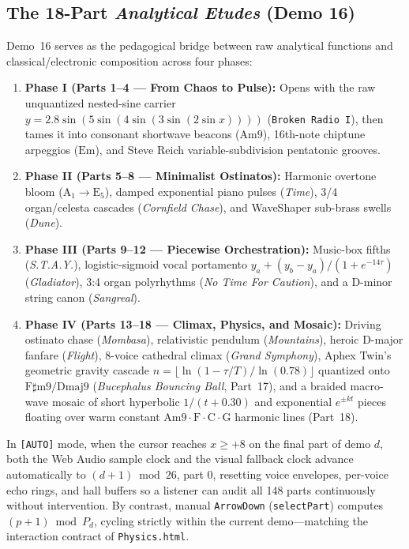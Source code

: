 \subsection*{The 18-Part \emph{Analytical Etudes} (Demo 16)}

Demo~16 serves as the pedagogical bridge between raw analytical functions and classical/electronic composition across four phases:
\begin{enumerate}[leftmargin=1.5em]
  \item \textbf{Phase I (Parts 1--4 — From Chaos to Pulse):} Opens with the raw unquantized nested-sine carrier $y = 2.8\sin(5\sin(4\sin(3\sin(2\sin x))))$ (\texttt{Broken Radio I}), then tames it into consonant shortwave beacons ($\mathrm{Am9}$), 16th-note chiptune arpeggios ($\mathrm{Em}$), and Steve Reich variable-subdivision pentatonic grooves.
  \item \textbf{Phase II (Parts 5--8 — Minimalist Ostinatos):} Harmonic overtone bloom ($\mathrm{A}_1 \to \mathrm{E}_5$), damped exponential piano pulses (\emph{Time}), 3/4 organ/celesta cascades (\emph{Cornfield Chase}), and WaveShaper sub-brass swells (\emph{Dune}).
  \item \textbf{Phase III (Parts 9--12 — Piecewise Orchestration):} Music-box fifths (\emph{S.T.A.Y.}), logistic-sigmoid vocal portamento $y_a + (y_b - y_a)/(1 + e^{-14\tau})$ (\emph{Gladiator}), 3:4 organ polyrhythms (\emph{No Time For Caution}), and a D-minor string canon (\emph{Sangreal}).
  \item \textbf{Phase IV (Parts 13--18 — Climax, Physics, and Mosaic):} Driving ostinato chase (\emph{Mombasa}), relativistic pendulum (\emph{Mountains}), heroic D-major fanfare (\emph{Flight}), 8-voice cathedral climax (\emph{Grand Symphony}), Aphex Twin's geometric gravity cascade $n = \lfloor \ln(1 - \tau/T)/\ln(0.78)\rfloor$ quantized onto $\mathrm{F}\sharp\mathrm{m9}/\mathrm{Dmaj9}$ (\emph{Bucephalus Bouncing Ball}, Part~17), and a braided macro-wave mosaic of short hyperbolic $1/(t+0.30)$ and exponential $e^{\pm kt}$ pieces floating over warm constant $\mathrm{Am9}\cdot\mathrm{F}\cdot\mathrm{C}\cdot\mathrm{G}$ harmonic lines (Part~18).
\end{enumerate}

\begin{proposition}
In \texttt{[AUTO]} mode, when the cursor reaches $x \ge +8$ on the final part of demo $d$, both the Web Audio sample clock and the visual fallback clock advance automatically to $(d+1) \bmod 26$, part $0$, resetting voice envelopes, per-voice echo rings, and hall buffers so a listener can audit all 148 parts continuously without intervention. By contrast, manual \texttt{ArrowDown} (\texttt{selectPart}) computes $(p + 1) \bmod P_d$, cycling strictly within the current demo—matching the interaction contract of \texttt{Physics.html}.
\end{proposition}

